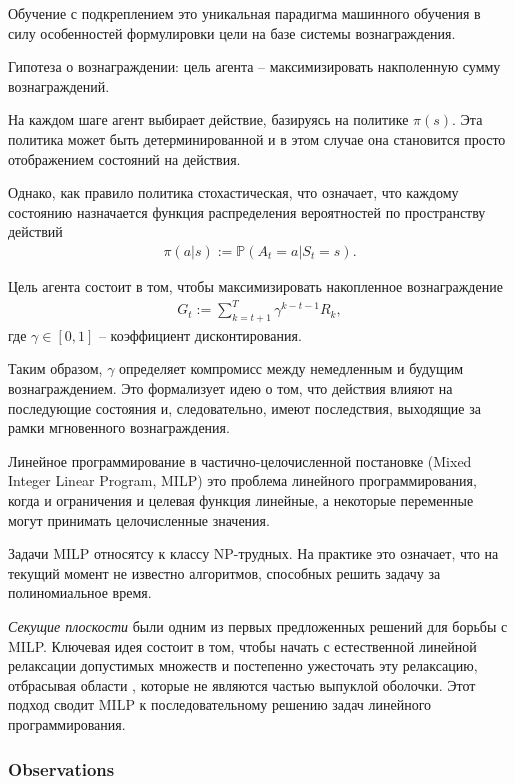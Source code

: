 \documentclass[%
	11pt,
	a4paper,
	utf8,
		]{article}
\begin{document}
Обучение с подкреплением это уникальная парадигма машинного обучения в силу особенностей формулировки цели на базе системы вознаграждения.

Гипотеза о вознаграждении: цель агента -- максимизировать накполенную сумму вознаграждений.

На каждом шаге агент выбирает действие, базируясь на политике $ \pi(s) $. Эта политика может быть детерминированной и в этом случае она становится просто отображением состояний на действия.

Однако, как правило политика стохастическая, что означает, что каждому состоянию назначается функция распределения вероятностей по пространству действий
\begin{align*}
	\pi (a | s) := \mathbb{P} (A_t = a | S_t = s).
\end{align*}

Цель агента состоит в том, чтобы максимизировать накопленное вознаграждение
\begin{align*}
	G_t := \sum_{k=t+1}^T \gamma^{k-t-1} R_k,
\end{align*}
где $ \gamma \in [0, 1] $ -- коэффициент дисконтирования.

Таким образом, $ \gamma $ определяет компромисс между немедленным и будущим вознаграждением. Это формализует идею о том, что действия влияют на последующие состояния и, следовательно, имеют последствия, выходящие за рамки мгновенного вознаграждения. 

Линейное программирование в частично-целочисленной постановке (Mixed Integer Linear Program, MILP) это проблема линейного программирования, когда и ограничения и целевая функция линейные, а некоторые переменные могут принимать целочисленные значения.

Задачи MILP относятсу к классу NP-трудных. На практике это означает, что на текущий момент не известно алгоритмов, способных решить задачу за полиномиальное время.

\emph{Секущие плоскости} были одним из первых предложенных решений для борьбы с MILP. Ключевая идея состоит в том, чтобы начать с естественной  линейной релаксации допустимых множеств и постепенно ужесточать эту релаксацию, отбрасывая области , которые не являются частью выпуклой оболочки. Этот подход сводит MILP к последовательному решению задач линейного программирования.



\subsubsection{Observations}
\end{document}
